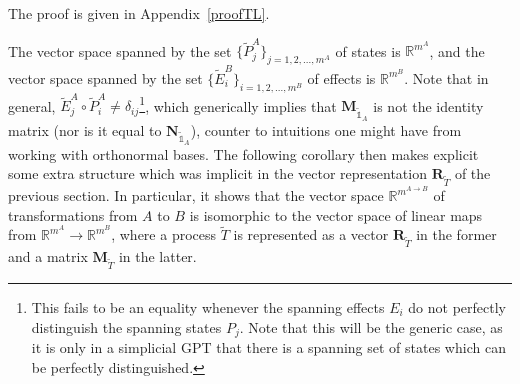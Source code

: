 \documentclass[onecolum,aps,groupedaddress,nofootinbib]{revtex4-2}
\newcommand{\david}{\color{blue}}
\newcommand{\blk}{\color{black}}
\begin{document}
The proof is given in Appendix~\ref{proofTL}.


The vector space spanned by the set  $\{\widetilde{P}_{j}^A \}_{j = 1,2,...,m^A}$ of states is $\mathds{R}^{m^A}$, and the vector space spanned by the set $\{\widetilde{E}_{i}^B \}_{i= 1,2,...,m^B}$ of effects is $\mathds{R}^{m^B}$.
Note that in general, $\widetilde{E}_j^A\circ\widetilde{P}_i^A \ne \delta_{ij}$\footnote{This fails to be an equality whenever the spanning effects $E_i$ do not perfectly distinguish the spanning states $P_j$. Note that this will be the generic case, as it is only in a simplicial GPT that there is a spanning set of states which can be perfectly distinguished.
}, which generically implies that $\mathbf{M}_{{\widetilde{\mathds{1}}}_A}$ is not the identity matrix (nor is it equal to $\mathbf{N}_{\widetilde{\mathds{1}}_A}$), counter to intuitions one might have from working with orthonormal bases.
The following corollary then makes explicit some extra structure which was implicit in the vector representation $\mathbf{R}_{\widetilde{T}}$ of the previous section. In particular, it
 shows that the vector space $\mathds{R}^{m^{A\to B}}$ of transformations from $A$ to $B$ is isomorphic to the vector space of linear maps from $\mathds{R}^{m^A}\to \mathds{R}^{m^B}$, where a process $\widetilde{T}$ is represented as a vector $\mathbf{R}_{\widetilde{T}}$ in the former and a matrix $\mathbf{M}_{\widetilde{T}}$ in the latter.
\end{document}

